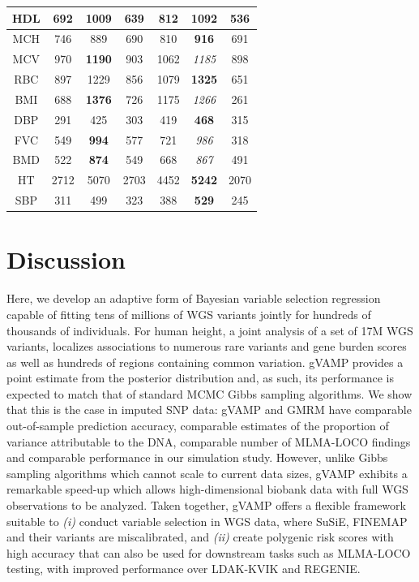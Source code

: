 \begin{table}[!ht]
\begin{center}
{\begin{tabular}{|| c || c || c || c || c | c || c ||}
 \hline
HDL & 692 & 1009 & 639 & 812 & \textbf{1092} & 536 \\
 \hline
MCH & 746 & 889 & 690 & 810 & \textbf{916} & 691 \\
 \hline
MCV & 970 & \textbf{1190} & 903 & 1062 & \emph{1185} & 898 \\
 \hline
RBC & 897 & 1229 & 856 & 1079 & \textbf{1325} & 651 \\
 \hline
BMI & 688 & \textbf{1376} & 726 & 1175 & \emph{1266} & 261\\
 \hline
DBP & 291 & 425 & 303 & 419 & \textbf{468} & 315 \\
 \hline
FVC & 549 & \textbf{994} & 577 & 721 & \emph{986} & 318 \\
 \hline 
BMD & 522 & \textbf{874} & 549 & 668 & \emph{867} & 491 \\
 \hline
HT & 2712 & 5070 & 2703 & 4452 & \textbf{5242} & 2070 \\
 \hline
SBP & 311 & 499 & 323 & 388 & \textbf{529} & 245 \\
\hline\hline
\end{tabular}
}
\end{center}
\label{table:table2}
\end{table}


\section{Discussion}
Here, we develop an adaptive form of Bayesian variable selection regression capable of fitting tens of millions of WGS variants jointly for hundreds of thousands of individuals. For human height, a joint analysis of a set of 17M WGS variants, localizes associations to numerous rare variants and gene burden scores as well as hundreds of regions containing common variation. gVAMP provides a point estimate from the posterior distribution and, as such, its performance is expected to match that of standard MCMC Gibbs sampling algorithms. We show that this is the case in imputed SNP data: gVAMP and GMRM have comparable out-of-sample prediction accuracy, comparable estimates of the proportion of variance attributable to the DNA, comparable number of MLMA-LOCO findings and comparable performance in our simulation study. However, unlike Gibbs sampling algorithms which cannot scale to current data sizes, gVAMP exhibits a remarkable speed-up which allows high-dimensional biobank data with full WGS observations to be analyzed. Taken together, gVAMP offers a flexible framework suitable to \emph{(i)} conduct variable selection in WGS data, where SuSiE, FINEMAP and their variants are miscalibrated, and \emph{(ii)} create polygenic risk scores with high accuracy that can also be used for downstream tasks such as MLMA-LOCO testing, with improved performance over LDAK-KVIK and REGENIE.

